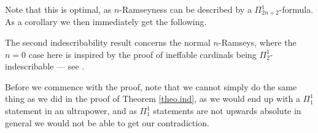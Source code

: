 \documentclass[../main]{subfiles}
\begin{document}
Note that this is optimal, as $n$-Ramseyness can be described by a $\Pi^1_{2n+2}$-formula. As a corollary we then immediately get the following.


The second indescribability result concerns the normal $n$-Ramseys, where the $n=0$ case here is inspired by the proof of ineffable cardinals being $\Pi^1_2$-indescribable --- see \cite{Abramson}.


Before we commence with the proof, note that we cannot simply do the same thing as we did in the proof of Theorem \ref{theo.ind}, as we would end up with a $\Pi^1_1$ statement in an ultrapower, and as $\Pi^1_1$ statements are not upwards absolute in general we would not be able to get our contradiction.\\
\end{document}
